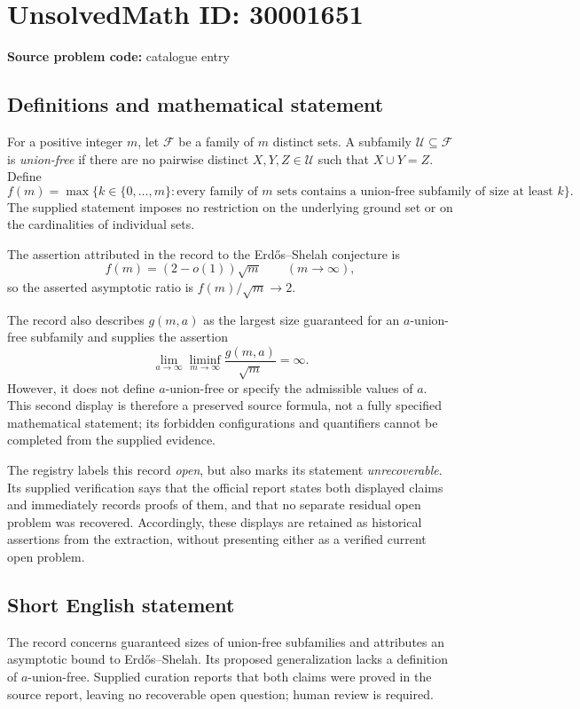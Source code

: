 \documentclass[11pt]{article}
\begin{document}
\section*{UnsolvedMath ID: 30001651}
\textbf{Source problem code:} catalogue entry
\subsection{Definitions and mathematical statement}
For a positive integer \(m\), let \(\mathcal F\) be a family of \(m\) distinct sets. A subfamily \(\mathcal U\subseteq\mathcal F\) is \emph{union-free} if there are no pairwise distinct \(X,Y,Z\in\mathcal U\) such that \(X\cup Y=Z\). Define
\[
f(m)=\max\bigl\{k\in\{0,\ldots,m\}:\text{every family of }m\text{ sets contains a union-free subfamily of size at least }k\bigr\}.
\]
The supplied statement imposes no restriction on the underlying ground set or on the cardinalities of individual sets.

The assertion attributed in the record to the Erd\H{o}s--Shelah conjecture is
\[
f(m)=(2-o(1))\sqrt m\qquad(m\to\infty),
\]
so the asserted asymptotic ratio is \(f(m)/\sqrt m\to2\).

The record also describes \(g(m,a)\) as the largest size guaranteed for an \(a\)-union-free subfamily and supplies the assertion
\[
\lim_{a\to\infty}\liminf_{m\to\infty}\frac{g(m,a)}{\sqrt m}=\infty.
\]
However, it does not define \(a\)-union-free or specify the admissible values of \(a\). This second display is therefore a preserved source formula, not a fully specified mathematical statement; its forbidden configurations and quantifiers cannot be completed from the supplied evidence.

The registry labels this record \emph{open}, but also marks its statement \emph{unrecoverable}. Its supplied verification says that the official report states both displayed claims and immediately records proofs of them, and that no separate residual open problem was recovered. Accordingly, these displays are retained as historical assertions from the extraction, without presenting either as a verified current open problem.
\subsection{Short English statement}
The record concerns guaranteed sizes of union-free subfamilies and attributes an asymptotic bound to Erd\H{o}s--Shelah. Its proposed generalization lacks a definition of \(a\)-union-free. Supplied curation reports that both claims were proved in the source report, leaving no recoverable open question; human review is required.
\end{document}
